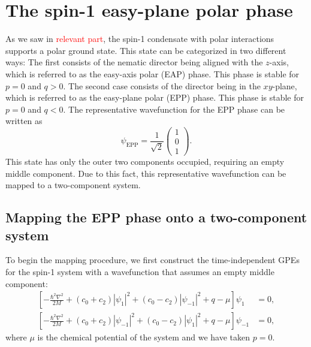 \section{The spin-1 easy-plane polar phase}
As we saw in \textcolor{red}{relevant part}, the spin-1 condensate with polar
interactions supports a polar ground state.
This state can be categorized in two different ways:
The first consists of the nematic director being aligned with the $z$-axis,
which is referred to as the easy-axis polar (EAP) phase.
This phase is stable for $p=0$ and $q>0$.
The second case consists of the director being in the $xy$-plane, which is
referred to as the easy-plane polar (EPP) phase.
This phase is stable for $p=0$ and $q<0$.
The representative wavefunction for the EPP phase can be written as
\begin{equation}
    \psi_\mathrm{EPP} = \frac{1}{\sqrt{2}}\begin{pmatrix}
        1 \\ 0 \\ 1
    \end{pmatrix}.
    \label{eq:EPP_wavefunction}
\end{equation}
This state has only the outer two components occupied, requiring an empty
middle component.
Due to this fact, this representative wavefunction can be mapped to a
two-component system.

\subsection{Mapping the EPP phase onto a two-component system}
To begin the mapping procedure, we first construct the time-independent
GPEs for the spin-1 system with a wavefunction that assumes an empty middle
component:
\begin{equation}
    \begin{aligned}
        \left[-\frac{\hbar^2\nabla^2}{2M}
        + (c_0 + c_2)|\psi_1|^2 + (c_0 - c_2)|\psi_{-1}|^2 
        + q - \mu\right]\psi_1 &= 0, \\
        \left[-\frac{\hbar^2\nabla^2}{2M}
        + (c_0 + c_2)|\psi_{-1}|^2 + (c_0 - c_2)|\psi_1|^2 
        + q - \mu\right]\psi_{-1} &= 0,
    \end{aligned}
    \label{eq:EPP-time-independent-GPEs}
\end{equation}
where $\mu$ is the chemical potential of the system and we have taken $p=0$.

